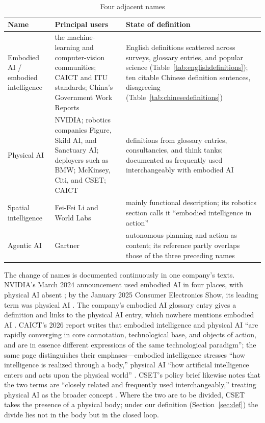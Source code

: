\documentclass[10pt]{article}
\begin{document}
\begin{table}[htbp]
\centering
\caption{Four adjacent names}
\label{tab:names}
\small
\begin{tabularx}{\textwidth}{>{\raggedright\arraybackslash}p{3.0cm}YY}
\toprule
Name & Principal users & State of definition \\
\midrule
Embodied AI / embodied intelligence & the machine-learning and computer-vision communities; CAICT and ITU standards; China's Government Work Reports & English definitions scattered across surveys, glossary entries, and popular science (Table~\ref{tab:englishdefinitions}); ten citable Chinese definition sentences, disagreeing (Table~\ref{tab:chinesedefinitions}) \\
Physical AI & NVIDIA; robotics companies Figure, Skild AI, and Sanctuary AI; deployers such as BMW; McKinsey, Citi, and CSET; CAICT \cite{nvglossary,figure_f03,bmw2026,mckinsey2026,citi2025,caict2026} & definitions from glossary entries, consultancies, and think tanks; documented as frequently used interchangeably with embodied AI \cite{cset2026} \\
Spatial intelligence & Fei-Fei Li and World Labs & mainly functional description; its robotics section calls it ``embodied intelligence in action'' \cite{feili2025} \\
Agentic AI & Gartner \cite{gartner2024} & autonomous planning and action as content; its reference partly overlaps those of the three preceding names \\
\bottomrule
\end{tabularx}
\end{table}

The change of names is documented continuously in one company's texts. NVIDIA's March 2024 announcement used embodied AI in four places, with physical AI absent \cite{nvidia2024}; by the January 2025 Consumer Electronics Show, its leading term was physical AI \cite{ces2025}. The company's embodied AI glossary entry gives a definition and links to the physical AI entry, which nowhere mentions embodied AI \cite{nvglossary}. CAICT's 2026 report writes that embodied intelligence and physical AI ``are rapidly converging in core connotation, technological base, and objects of action, and are in essence different expressions of the same technological paradigm''; the same page distinguishes their emphases---embodied intelligence stresses ``how intelligence is realized through a body,'' physical AI ``how artificial intelligence enters and acts upon the physical world'' \cite{caict2026}. CSET's policy brief likewise notes that the two terms are ``closely related and frequently used interchangeably,'' treating physical AI as the broader concept \cite{cset2026}. Where the two are to be divided, CSET takes the presence of a physical body; under our definition (Section~\ref{sec:def}) the divide lies not in the body but in the closed loop.
\end{document}
